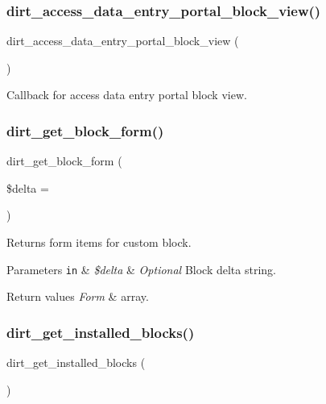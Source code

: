 \subsubsection{\texorpdfstring{dirt\+\_\+access\+\_\+data\+\_\+entry\+\_\+portal\+\_\+block\+\_\+view()}{dirt\_access\_data\_entry\_portal\_block\_view()}}
{\footnotesize\ttfamily dirt\+\_\+access\+\_\+data\+\_\+entry\+\_\+portal\+\_\+block\+\_\+view (\begin{DoxyParamCaption}{ }\end{DoxyParamCaption})}

Callback for access data entry portal block view. \mbox{\label{dirt_8blocks_8inc_ad8b36bd9c0cfe696e9cba1019bf0c215}} 
\subsubsection{\texorpdfstring{dirt\+\_\+get\+\_\+block\+\_\+form()}{dirt\_get\_block\_form()}}
{\footnotesize\ttfamily dirt\+\_\+get\+\_\+block\+\_\+form (\begin{DoxyParamCaption}\item[{}]{\$delta = {\ttfamily \textquotesingle{}\textquotesingle{}} }\end{DoxyParamCaption})}

Returns form items for custom block.


\begin{DoxyParams}[1]{Parameters}
\mbox{\tt in}  & {\em \$delta} & {\itshape Optional} Block delta string.\\
\hline
\end{DoxyParams}

\begin{DoxyRetVals}{Return values}
{\em Form} & array. \\
\hline
\end{DoxyRetVals}
\mbox{\label{dirt_8blocks_8inc_a2c698c2cb98473d22312359f503a7934}} 
\subsubsection{\texorpdfstring{dirt\+\_\+get\+\_\+installed\+\_\+blocks()}{dirt\_get\_installed\_blocks()}}
{\footnotesize\ttfamily dirt\+\_\+get\+\_\+installed\+\_\+blocks (\begin{DoxyParamCaption}{ }\end{DoxyParamCaption})}

